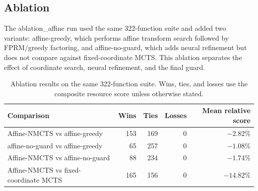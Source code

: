 \documentclass[11pt]{article}
\newcommand{\method}{Resource-NMCTS}
\newcommand{\affinemethod}{Affine-NMCTS}
\newcommand{\ablationdataset}{ablation\_affine}
\newcommand{\ultradataset}{ultra\_highdim\_resource}
\newcommand{\megadataset}{mega\_highdim\_resource}
\begin{document}
\begin{table}[t]
\centering
\small
\caption{\method{} compared with exported ABC-AIG, ABC-XAG, ABC-LUT, and BDD baselines
on the high-dimensional $n=14$ and $n=15$ random-ANF suites.  Rows use verified
ABC-optimized or LUT-mapped BLIF, or verified reduced ordered BDDs, with
logic-level resource estimates.  Negative mean relative values favor \method{}.}
\label{tab:external-highdim-aig}

\end{table}

\begin{table}[t]
\centering
\small
\caption{\method{} compared with exported ABC-AIG, ABC-XAG, ABC-LUT, and BDD
baselines on the \ultradataset{} $n=16$ scale check.  Score columns report
weighted-score wins/losses/ties and mean relative score.  Depth columns expose
the ABC depth counterweight.}
\label{tab:external-ultra}

\end{table}

\begin{table}[t]
\centering
\small
\caption{\method{} compared with exported ABC-AIG, ABC-XAG, ABC-LUT, and BDD
baselines on the \megadataset{} $n=18$ stress check.  Score columns report
weighted-score wins/losses/ties and mean relative score.  Depth columns expose
the ABC depth counterweight.}
\label{tab:external-mega}

\end{table}

\subsection{Ablation}

The \ablationdataset{} run used the same 322-function suite and added two
variants: affine-greedy, which performs affine transform search followed by
FPRM/greedy factoring, and affine-no-guard, which adds neural refinement but
does not compare against fixed-coordinate MCTS.  This ablation separates the
effect of coordinate search, neural refinement, and the final guard.

\begin{table}[t]
\centering
\caption{Ablation results on the same 322-function suite.  Wins, ties, and
losses use the composite resource score unless otherwise stated.}
\label{tab:ablation}
\begin{tabular}{lrrrr}
\toprule
Comparison & Wins & Ties & Losses & Mean relative score \\
\midrule
\affinemethod{} vs affine-greedy & 153 & 169 & 0 & $-2.82\%$ \\
affine-no-guard vs affine-greedy & 65 & 257 & 0 & $-1.08\%$ \\
\affinemethod{} vs affine-no-guard & 88 & 234 & 0 & $-1.74\%$ \\
\affinemethod{} vs fixed-coordinate MCTS & 165 & 156 & 0 & $-14.82\%$ \\
\bottomrule
\end{tabular}
\end{table}
\end{document}
